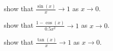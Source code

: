 \documentclass{article}
\begin{document}
\begin{myleftlinebox}
	show that $\frac{\sin(x)}{x}\to 1$ as $x\to 0$.
	\tcblower
	\vspace{2em}
\end{myleftlinebox}

\begin{myleftlinebox}
	show that $\frac{1-\cos(x)}{0.5x^2}\to 1$ as $x\to 0$.
	\tcblower
	\vspace{2em}
\end{myleftlinebox}

\begin{myleftlinebox}
	show that $\frac{\tan(x)}{x}\to 1$ as $x\to 0$.
	\tcblower
	\vspace{2em}
\end{myleftlinebox}
\end{document}
